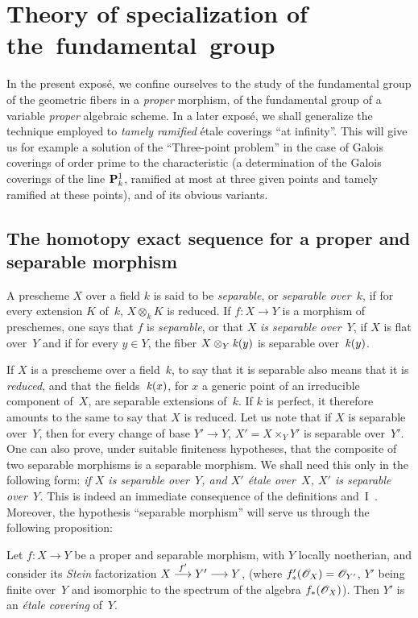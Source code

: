 \chapter{Theory of specialization of the~fundamental~group}
\label{X}
In the present expos\'e, we confine ourselves to the study of the
fundamental group of the geometric fibers in a
\emph{proper} morphism, \ie of the fundamental group of a variable
\emph{proper} algebraic scheme. In a later
expos\'e, we shall generalize the technique employed
to \emph{tamely ramified} \'etale coverings
``at infinity''. This will give us for example a solution of the
``Three-point problem'' in the case of Galois
coverings of order prime to the characteristic (\ie a
determination of the Galois coverings of the line
$\mathbf{P}_k^1$, ramified at most at three given points and
tamely ramified at these points), and of its obvious
variants.

\section[The homotopy exact sequence for a proper morphism]
{The homotopy exact sequence for a proper and separable morphism}
\label{X.1}

\begin{definition}
\label{X.1.1}
A prescheme $X$ over a field $k$ is said to be
\emph{separable}, or \emph{separable over~$k$}, if for every
extension $K$ of~$k$, $X\otimes_k K$ is reduced. If $f\colon X\to
Y$ is a morphism of preschemes, one says that $f$ is
\emph{separable}, or that $X$ \emph{is separable over~$Y$}, if
$X$ is flat over~$Y$ and if for every $y\in Y$, the fiber $X\otimes_Y
\mathit{k}(y)$ is separable over~$\mathit{k}(y)$.
\end{definition}

If $X$ is a prescheme over a field~$k$, to say that it is
separable also means that it is \emph{reduced}, and that the
fields~$\mathit{k}(x)$, for $x$ a generic point of an irreducible
component of~$X$, are separable extensions of~$k$. If
$k$ is perfect, it therefore amounts to the same to say that $X$ is
reduced. Let us note that if $X$ is separable over~$Y$, then for
every change of base $Y'\to Y$, $X'=X\times_Y Y'$ is separable
over~$Y'$. One can also prove, under suitable finiteness
hypotheses, that the composite of two separable
morphisms is
a separable morphism. We shall need this only in the
following form: \emph{if $X$ is separable over~$Y$, and $X'$
\'etale over~$X$, $X'$ is separable over~$Y$.} This is indeed
an immediate consequence of the definitions
and~I~. Moreover, the hypothesis ``separable
morphism'' will serve us through the following
proposition:
\begin{proposition}
\label{X.1.2}
Let $f\colon X\to Y$ be a proper and separable morphism, with $Y$
locally noetherian, and consider its \emph{Stein}
factorization $X\lto{f'}Y'\dpl\to Y$, (where
$f_*'(\cal{O}_X)=\cal{O}_{Y'}$, $Y'$ being finite over~$Y$ and
isomorphic to the spectrum of the algebra $f_*(\cal{O}_X)$). Then $Y'$
is an \emph{\'etale covering} of~$Y$.
\end{proposition}

